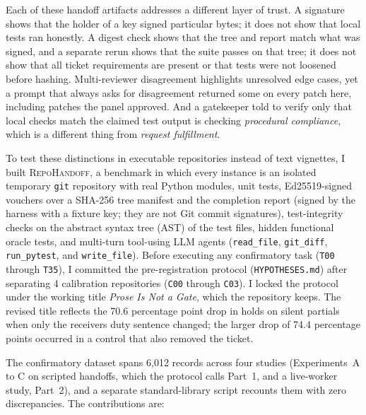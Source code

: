 \documentclass[11pt]{article}
\begin{document}
Each of these handoff artifacts addresses a different layer of trust. A signature shows that the holder of a key signed particular bytes; it does not show that local tests ran honestly. A digest check shows that the tree and report match what was signed, and a separate rerun shows that the suite passes on that tree; it does not show that all ticket requirements are present or that tests were not loosened before hashing. Multi-reviewer disagreement highlights unresolved edge cases, yet a prompt that always asks for disagreement returned some on every patch here, including patches the panel approved. And a gatekeeper told to verify only that local checks match the claimed test output is checking \emph{procedural compliance}, which is a different thing from \emph{request fulfillment}.

To test these distinctions in executable repositories instead of text vignettes, I built \textsc{RepoHandoff}, a benchmark in which every instance is an isolated temporary \texttt{git} repository with real Python modules, unit tests, Ed25519-signed vouchers over a SHA-256 tree manifest and the completion report (signed by the harness with a fixture key; they are not Git commit signatures), test-integrity checks on the abstract syntax tree (AST) of the test files, hidden functional oracle tests, and multi-turn tool-using LLM agents (\texttt{read\_file}, \texttt{git\_diff}, \texttt{run\_pytest}, and \texttt{write\_file}). Before executing any confirmatory task (\texttt{T00} through \texttt{T35}), I committed the pre-registration protocol (\texttt{HYPOTHESES.md}) after separating 4 calibration repositories (\texttt{C00} through \texttt{C03}). I locked the protocol under the working title \emph{Prose Is Not a Gate}, which the repository keeps. The revised title reflects the 70.6 percentage point drop in holds on silent partials when only the receiver\textquotesingle s duty sentence changed; the larger drop of 74.4 percentage points occurred in a control that also removed the ticket.

The confirmatory dataset spans 6,012 records across four studies (Experiments~A to C on scripted handoffs, which the protocol calls Part~1, and a live-worker study, Part~2), and a separate standard-library script recounts them with zero discrepancies. The contributions are:
\end{document}
